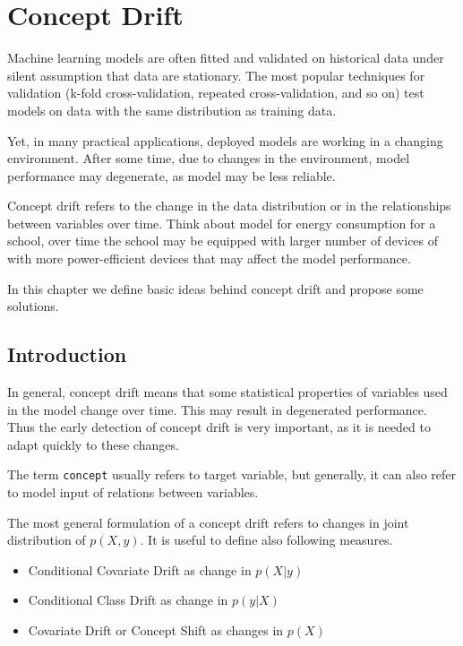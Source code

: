 \documentclass[12pt,]{krantz}
\providecommand{\tightlist}{%
  \setlength{\itemsep}{0pt}\setlength{\parskip}{0pt}}
\begin{document}
\hypertarget{conceptDrift}{%
\section{Concept Drift}\label{conceptDrift}}

Machine learning models are often fitted and validated on historical data under silent assumption that data are stationary. The most popular techniques for validation (k-fold cross-validation, repeated cross-validation, and so on) test models on data with the same distribution as training data.

Yet, in many practical applications, deployed models are working in a changing environment. After some time, due to changes in the environment, model performance may degenerate, as model may be less reliable.

Concept drift refers to the change in the data distribution or in the relationships between variables over time. Think about model for energy consumption for a school, over time the school may be equipped with larger number of devices of with more power-efficient devices that may affect the model performance.

In this chapter we define basic ideas behind concept drift and propose some solutions.

\hypertarget{introduction-1}{%
\subsection{Introduction}\label{introduction-1}}

In general, concept drift means that some statistical properties of variables used in the model change over time. This may result in degenerated performance. Thus the early detection of concept drift is very important, as it is needed to adapt quickly to these changes.

The term \texttt{concept} usually refers to target variable, but generally, it can also refer to model input of relations between variables.

The most general formulation of a concept drift refers to changes in joint distribution of \(p(X, y)\). It is useful to define also following measures.

\begin{itemize}
\tightlist
\item
  Conditional Covariate Drift as change in \(p(X | y)\)
\item
  Conditional Class Drift as change in \(p(y | X)\)
\item
  Covariate Drift or Concept Shift as changes in \(p(X)\)
\end{itemize}
\end{document}

